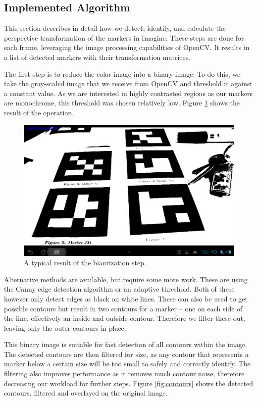 \subsection{Implemented Algorithm}
\label{detection_workflow}

This section describes in detail how we detect, identify, and calculate the perspective transformation of the markers in Imagine.
These steps are done for each frame, leveraging the image processing capabilities of OpenCV.
It results in a list of detected markers with their transformation matrices.

The first step is to reduce the color image into a binary image.
To do this, we take the gray-scaled image that we receive from OpenCV and threshold it against a constant value.
As we are interested in highly contrasted regions as our markers are monochrome, this threshold was chosen relatively low.
Figure \ref{fig:binary} shows the result of the operation.

\begin{figure}[H]
	\centering
	\includegraphics[width=14cm]{img/binary.png}
	\caption[Binarization]{A typical result of the bianrization step.}
	\label{fig:binary}
\end{figure}

Alternative methods are available, but require some more work.
These are using the Canny edge detection algorithm or an adaptive threshold.
Both of these however only detect edges as black on white lines.
These can also be used to get possible contours but result in two contours for a marker – one on each side of the line, effectively an inside and outside contour.
Therefore we filter these out, leaving only the outer contours in place.

This binary image is suitable for fast detection of all contours within the image.
The detected contours are then filtered for size, as any contour that represents a marker below a certain size will be too small to safely and correctly identify.
The filtering also improves performance as it removes much contour noise, therefore decreasing our workload for further steps.
Figure \ref{fig:contours} shows the detected contours, filtered and overlayed on the original image.

